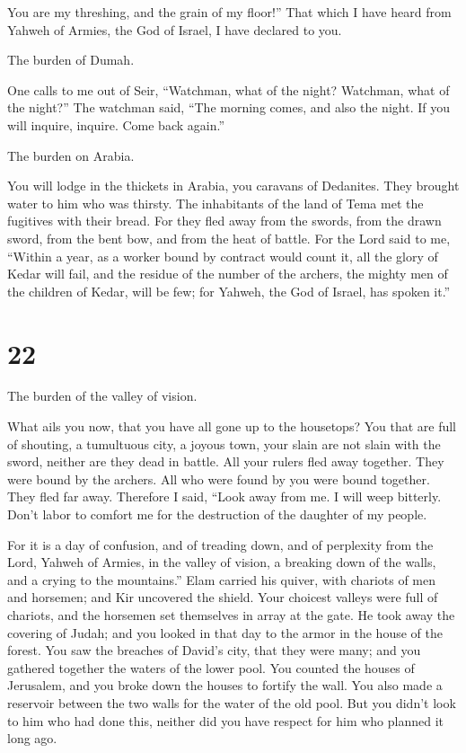  You are my threshing, and the grain of my floor!'' That
which I have heard from Yahweh of Armies, the God of Israel, I have
declared to you.

 The burden of Dumah.

One calls to me out of Seir, ``Watchman, what of the night? Watchman,
what of the night?''  The watchman said, ``The morning
comes, and also the night. If you will inquire, inquire. Come back
again.''

 The burden on Arabia.

You will lodge in the thickets in Arabia, you caravans of Dedanites.
 They brought water to him who was thirsty. The
inhabitants of the land of Tema met the fugitives with their bread.
 For they fled away from the swords, from the drawn
sword, from the bent bow, and from the heat of battle. 
For the Lord said to me, ``Within a year, as a worker bound by contract
would count it, all the glory of Kedar will fail,  and
the residue of the number of the archers, the mighty men of the children
of Kedar, will be few; for Yahweh, the God of Israel, has spoken it.''

\hypertarget{section-21}{%
\section{22}\label{section-21}}

 The burden of the valley of vision.

What ails you now, that you have all gone up to the housetops?
 You that are full of shouting, a tumultuous city, a
joyous town, your slain are not slain with the sword, neither are they
dead in battle.  All your rulers fled away together. They
were bound by the archers. All who were found by you were bound
together. They fled far away.  Therefore I said, ``Look
away from me. I will weep bitterly. Don't labor to comfort me for the
destruction of the daughter of my people.

 For it is a day of confusion, and of treading down, and
of perplexity from the Lord, Yahweh of Armies, in the valley of vision,
a breaking down of the walls, and a crying to the mountains.''
 Elam carried his quiver, with chariots of men and
horsemen; and Kir uncovered the shield.  Your choicest
valleys were full of chariots, and the horsemen set themselves in array
at the gate.  He took away the covering of Judah; and you
looked in that day to the armor in the house of the forest.
 You saw the breaches of David's city, that they were
many; and you gathered together the waters of the lower pool.
 You counted the houses of Jerusalem, and you broke down
the houses to fortify the wall.  You also made a
reservoir between the two walls for the water of the old pool. But you
didn't look to him who had done this, neither did you have respect for
him who planned it long ago.

